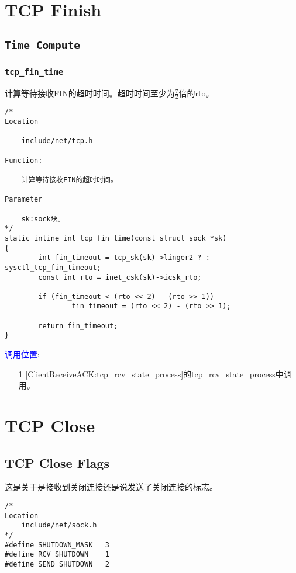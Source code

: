 \section{TCP Finish}
    \subsection{\texttt{Time Compute}}
        \subsubsection{\texttt{tcp_fin_time}}
            计算等待接收FIN的超时时间。超时时间至少为$\frac{7}{2}$倍的rto。
\begin{verbatim}
/*
Location

    include/net/tcp.h

Function:

    计算等待接收FIN的超时时间。

Parameter

    sk:sock块。
*/
static inline int tcp_fin_time(const struct sock *sk)
{
        int fin_timeout = tcp_sk(sk)->linger2 ? : sysctl_tcp_fin_timeout;
        const int rto = inet_csk(sk)->icsk_rto;

        if (fin_timeout < (rto << 2) - (rto >> 1))
                fin_timeout = (rto << 2) - (rto >> 1);

        return fin_timeout;
}
\end{verbatim}
        \textcolor{blue}{调用位置}:

            \begin{enumerate}
                \item[1]        \ref{ClientReceiveACK:tcp_rcv_state_process}的tcp\_rcv\_state\_process中调用。
            \end{enumerate}

\section{TCP Close}
        \subsection{TCP Close Flags}
            这是关于是接收到关闭连接还是说发送了关闭连接的标志。
\begin{verbatim}
/*
Location
    include/net/sock.h
*/
#define SHUTDOWN_MASK   3
#define RCV_SHUTDOWN    1
#define SEND_SHUTDOWN   2
\end{verbatim}

